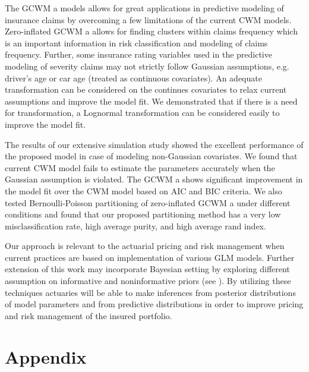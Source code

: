 \documentclass[11pt,letterpaper]{article}
\numberwithin{equation}{section}
\numberwithin{equation}{section}
\numberwithin{equation}{section}
\begin{document}
The GCWM a models allows for great applications in predictive modeling of insurance claims by overcoming a few limitations of the current CWM models. Zero-inflated GCWM a allows for finding clusters within claims frequency which is an important information in risk classification and modeling of claims frequency. Further, some insurance rating variables used in the predictive modeling of severity claims may not strictly follow Gaussian assumptions, e.g. driver's age or car age (treated as continuous covariates). An adequate transformation can be considered on the continues covariates to relax current assumptions and improve the model fit. We demonstrated that if there is a need for transformation, a Lognormal transformation can be considered easily to improve the model fit. 

The results of our extensive simulation study showed the excellent performance of the proposed model in case of modeling non-Gaussian covariates. We found  that current CWM model fails to estimate the parameters accurately when the Gaussian assumption is violated. The GCWM a shows significant improvement in the model fit over the CWM model based on AIC and BIC criteria. We also tested Bernoulli-Poisson partitioning of zero-inflated GCWM a under different conditions and found that our proposed partitioning method has a very low misclassification rate, high average purity, and high average rand index.

Our approach is relevant to the actuarial pricing and risk management when current practices are based on implementation of various GLM models. Further extension of this work may incorporate Bayesian setting by exploring different assumption on informative and noninformative priors (see \cite{Ibrahim+Laud:1991}). By utilizing these techniques actuaries will be able to make inferences from posterior distributions of model parameters and from predictive distributions in order to improve pricing and risk management of the insured portfolio. 
\newpage
\section{Appendix}
\end{document}
